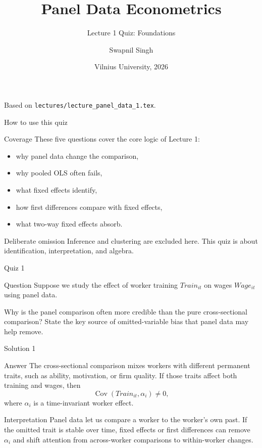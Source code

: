 \documentclass[10pt]{beamer}
\title{Panel Data Econometrics}
\subtitle{Lecture 1 Quiz: Foundations}
\author{Swapnil Singh}
\institute{Lietuvos Bankas \and Kaunas University of Technology}
\date{Vilnius University, 2026}
\DeclareMathOperator{\Cov}{Cov}
\begin{document}
\begin{frame}[plain]
  \titlepage
  \vfill
  {\scriptsize\color{gray} Based on \texttt{lectures/lecture\_panel\_data\_1.tex}.}
\end{frame}

\begin{frame}{How to use this quiz}
\small
\begin{block}{Coverage}
These five questions cover the core logic of Lecture 1:
\begin{itemize}
  \item why panel data change the comparison,
  \item why pooled OLS often fails,
  \item what fixed effects identify,
  \item how first differences compare with fixed effects,
  \item what two-way fixed effects absorb.
\end{itemize}
\end{block}

\begin{alertblock}{Deliberate omission}
Inference and clustering are excluded here. This quiz is about identification, interpretation, and algebra.
\end{alertblock}
\end{frame}

\begin{frame}{Quiz 1}
\small
\begin{block}{Question}
Suppose we study the effect of worker training $Train_{it}$ on wages $Wage_{it}$ using panel data.

Why is the panel comparison often more credible than the pure cross-sectional comparison? State the key source of omitted-variable bias that panel data may help remove.
\end{block}
\end{frame}

\begin{frame}{Solution 1}
\small
\begin{exampleblock}{Answer}
The cross-sectional comparison mixes workers with different permanent traits, such as ability, motivation, or firm quality. If those traits affect both training and wages, then
\[
\Cov(Train_{it},\alpha_i)\neq 0,
\]
where $\alpha_i$ is a time-invariant worker effect.
\end{exampleblock}

\begin{block}{Interpretation}
Panel data let us compare a worker to the worker's own past. If the omitted trait is stable over time, fixed effects or first differences can remove $\alpha_i$ and shift attention from across-worker comparisons to within-worker changes.
\end{block}
\end{frame}
\end{document}
